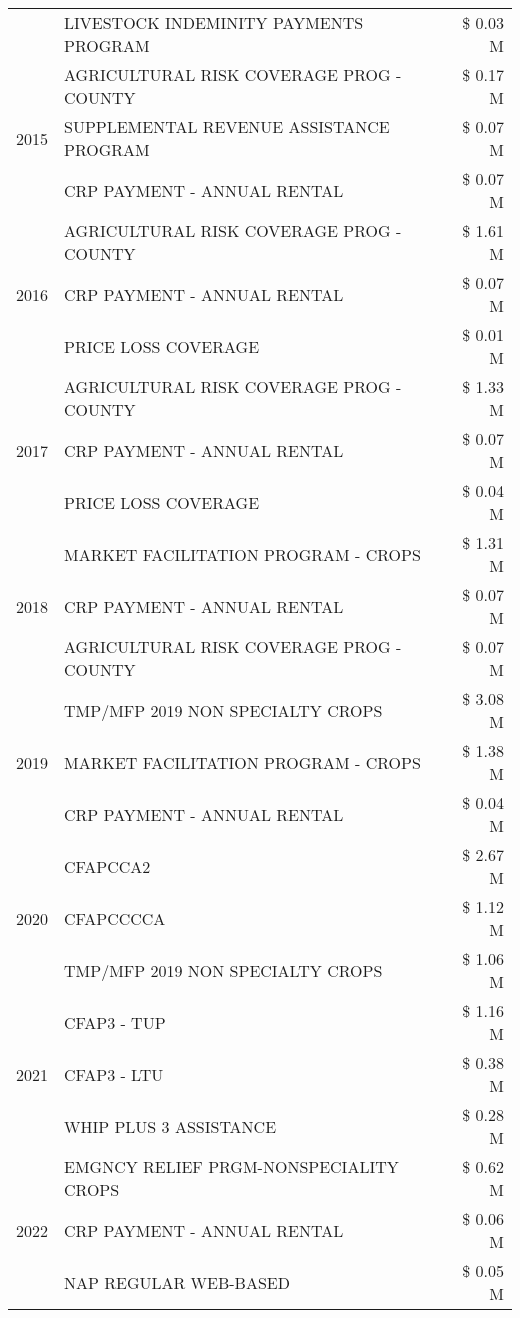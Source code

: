 \begin{tabular}{llr}
 & LIVESTOCK INDEMINITY PAYMENTS PROGRAM & \$ 0.03 M \\
\cline{1-3}
\multirow[t]{3}{*}{2015} & AGRICULTURAL RISK COVERAGE PROG - COUNTY & \$ 0.17 M \\
 & SUPPLEMENTAL REVENUE ASSISTANCE PROGRAM & \$ 0.07 M \\
 & CRP PAYMENT - ANNUAL RENTAL & \$ 0.07 M \\
\cline{1-3}
\multirow[t]{3}{*}{2016} & AGRICULTURAL RISK COVERAGE PROG - COUNTY & \$ 1.61 M \\
 & CRP PAYMENT - ANNUAL RENTAL & \$ 0.07 M \\
 & PRICE LOSS COVERAGE & \$ 0.01 M \\
\cline{1-3}
\multirow[t]{3}{*}{2017} & AGRICULTURAL RISK COVERAGE PROG - COUNTY & \$ 1.33 M \\
 & CRP PAYMENT - ANNUAL RENTAL & \$ 0.07 M \\
 & PRICE LOSS COVERAGE & \$ 0.04 M \\
\cline{1-3}
\multirow[t]{3}{*}{2018} & MARKET FACILITATION PROGRAM - CROPS & \$ 1.31 M \\
 & CRP PAYMENT - ANNUAL RENTAL & \$ 0.07 M \\
 & AGRICULTURAL RISK COVERAGE PROG - COUNTY & \$ 0.07 M \\
\cline{1-3}
\multirow[t]{3}{*}{2019} & TMP/MFP 2019 NON SPECIALTY CROPS & \$ 3.08 M \\
 & MARKET FACILITATION PROGRAM - CROPS & \$ 1.38 M \\
 & CRP PAYMENT - ANNUAL RENTAL & \$ 0.04 M \\
\cline{1-3}
\multirow[t]{3}{*}{2020} & CFAPCCA2 & \$ 2.67 M \\
 & CFAPCCCCA & \$ 1.12 M \\
 & TMP/MFP 2019 NON SPECIALTY CROPS & \$ 1.06 M \\
\cline{1-3}
\multirow[t]{3}{*}{2021} & CFAP3 - TUP & \$ 1.16 M \\
 & CFAP3 - LTU & \$ 0.38 M \\
 & WHIP PLUS 3 ASSISTANCE & \$ 0.28 M \\
\cline{1-3}
\multirow[t]{3}{*}{2022} & EMGNCY RELIEF PRGM-NONSPECIALITY CROPS & \$ 0.62 M \\
 & CRP PAYMENT - ANNUAL RENTAL & \$ 0.06 M \\
 & NAP REGULAR WEB-BASED & \$ 0.05 M \\
\cline{1-3}
\bottomrule
\end{tabular}
